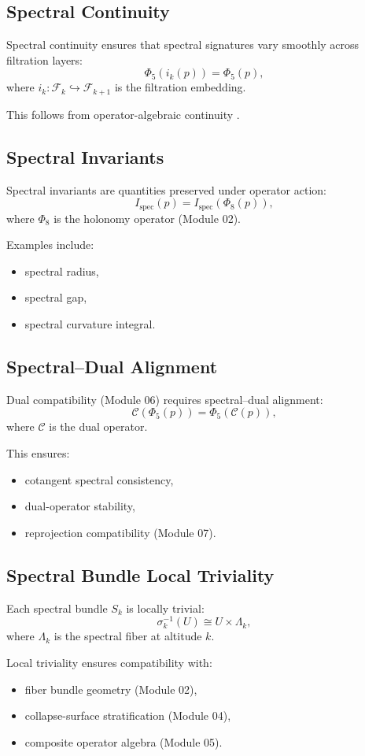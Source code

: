 \subsection{Spectral Continuity}
Spectral continuity ensures that spectral signatures vary smoothly across
filtration layers:
\[
\Phi_5(i_k(p)) = \Phi_5(p),
\]
where $i_k : \mathcal{F}_k \hookrightarrow \mathcal{F}_{k+1}$ is the filtration
embedding.

This follows from operator-algebraic continuity
.

\subsection{Spectral Invariants}
Spectral invariants are quantities preserved under operator action:
\[
I_{\mathrm{spec}}(p) = I_{\mathrm{spec}}(\Phi_8(p)),
\]
where $\Phi_8$ is the holonomy operator (Module 02).

Examples include:
\begin{itemize}
    \item spectral radius,
    \item spectral gap,
    \item spectral curvature integral.
\end{itemize}

\subsection{Spectral–Dual Alignment}
Dual compatibility (Module 06) requires spectral–dual alignment:
\[
\mathcal{C}(\Phi_5(p)) = \Phi_5(\mathcal{C}(p)),
\]
where $\mathcal{C}$ is the dual operator.

This ensures:
\begin{itemize}
    \item cotangent spectral consistency,
    \item dual-operator stability,
    \item reprojection compatibility (Module 07).
\end{itemize}

\subsection{Spectral Bundle Local Triviality}
Each spectral bundle $S_k$ is locally trivial:
\[
\sigma_k^{-1}(U) \cong U \times \Lambda_k,
\]
where $\Lambda_k$ is the spectral fiber at altitude $k$.

Local triviality ensures compatibility with:
\begin{itemize}
    \item fiber bundle geometry (Module 02),
    \item collapse-surface stratification (Module 04),
    \item composite operator algebra (Module 05).
\end{itemize}

